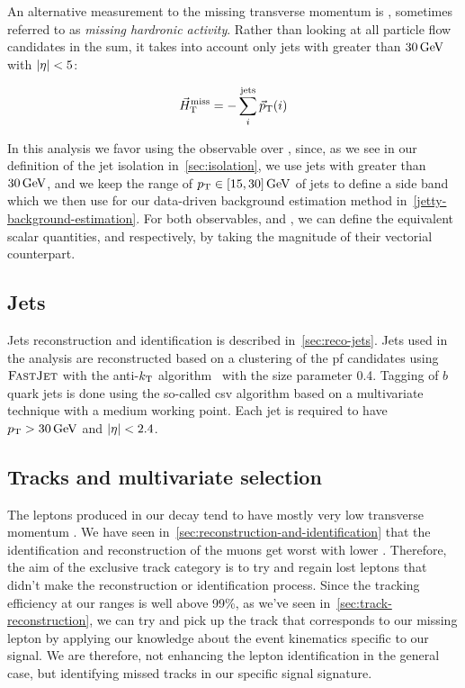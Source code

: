 An alternative measurement to the missing transverse momentum is \htvecmiss, sometimes referred to as \emph{missing hardronic activity}. Rather than looking at all particle flow candidates in the sum, it takes into account only jets with \pt greater than $30\,\text{Ge\hspace{-.08em}V}$ with $\lvert \eta \rvert<5$:

\begin{equation}
\vec{H}_{\text{T}}^{\text{miss}} = -\sum_i^{\mathrm{jets}} {\vec p}_{\mathrm{T}}(i)
\end{equation}

In this analysis we favor using the observable \htvecmiss over \VEtmiss, since, as we see in our definition of the jet isolation in~\ref{sec:isolation}, we use jets with \pt greater than $30\,\text{Ge\hspace{-.08em}V}$, and we keep the range of $p_{\mathrm{T}}\in [15,30]\,\text{Ge\hspace{-.08em}V}$ of jets to define a side band which we then use for our data-driven background estimation method in~\ref{jetty-background-estimation}. For both observables, \VEtmiss and \htvecmiss, we can define the equivalent scalar quantities, \MET and \mht respectively, by taking the magnitude of their vectorial counterpart.

\subsection{Jets}
\label{subsec:jets}

Jets reconstruction and identification is described in~\ref{sec:reco-jets}. Jets used in the analysis are reconstructed based on a clustering of the \gls{pf} candidates using ${\textsc{FastJet}}$ with the anti-$k_{\mathrm{T}}$ algorithm~\cite{Cacciari_2008_antikt} with the size parameter 0.4. Tagging of $b$ quark jets is done using the so-called \gls{csv} algorithm based on a multivari­ate technique \DEEPCSV with a medium working point. Each jet is required to have $p_{\mathrm{T}}>30\,\text{Ge\hspace{-.08em}V}$ and $\lvert \eta \rvert<2.4$.

\clearpage
\subsection{Tracks and multivariate selection }
\label{sec:track-bdt}
The leptons \ellell produced in our decay \neuttdecay tend to have mostly very low transverse momentum \pt. We have seen in~\ref{sec:reconstruction-and-identification} that the identification and reconstruction of the muons get worst with lower \pt. Therefore, the aim of the exclusive track category is to try and regain lost leptons that didn't make the reconstruction or identification process. Since the tracking efficiency at our \pt ranges is well above 99\%, as we've seen in~\ref{sec:track-reconstruction}, we can try and pick up the track that corresponds to our missing lepton by applying our knowledge about the event kinematics specific to our signal. We are therefore, not enhancing the lepton identification in the general case, but identifying missed tracks in our specific signal signature.


